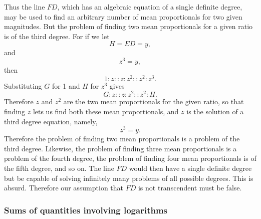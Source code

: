 \documentclass[twoside,openright]{article}
\begin{document}
 
\label{begmprop} Thus the line $FD$, which has an algebraic equation of a single definite degree, may be used to find an arbitrary number of mean proportionals for two given magnitudes.   But the problem of
finding two mean proportionals for a given ratio is of the third degree. For if we let
$$H = ED =y,$$
and
$$z^3 =y,$$
then
$$1\!:\! z :: z \!:\! z^2 :: z^2 \!:\! z^3.$$
Substituting $G$ for 1 and $H$ for $z^3$ gives
$$G\!:\! z :: z \!:\! z^2 :: z^2 \!:\! H.$$
Therefore $z$ and $z^2$ are the two mean proportionals for the given ratio, so that finding $z$ lets us find both these mean proportionals,  and $z$ is the solution of a third degree equation, namely,
$$z^3 = y.$$
Therefore the problem of finding two mean proportionals is a problem of the third degree.
Likewise, the problem of finding three mean proportionals is a problem of the fourth degree, the problem of finding four mean proportionals is of the fifth degree, and so on.  The line $FD$ would then have a single definite degree but be capable of solving infinitely many problems of all possible degrees.  This is absurd.  Therefore our assumption that $FD$ is not transcendent must be false.
\label{endmprop}
\label{elogtp}


\subsubsection*{Sums of quantities involving logarithms}

\setcounter{equation}{0}
\end{document}
